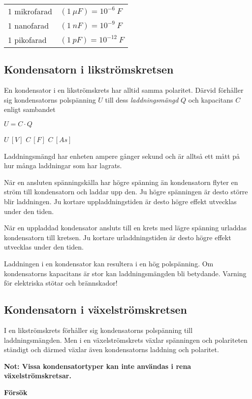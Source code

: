 \begin{tabular}{ll}
1 mikrofarad & \((1\ \mu F) = 10^{-6}\ F\) \\
1 nanofarad & \((1\ nF) = 10^{-9}\ F\) \\
1 pikofarad & \((1\ pF) = 10^{-12}\ F\) \\
\end{tabular}

\subsection{Kondensatorn i likströmskretsen}

En kondensator i en likströmskrets har alltid samma polaritet.
Därvid förhåller sig kondensatorns polspänning \(U\) till dess
\emph{laddningsmängd} \(Q\) och kapacitans \(C\) enligt sambandet

\(U = C \cdot Q\)

\(U\ [V]\) \(C\ [F]\) \(C\ [As]\)

Laddningsmängd har enheten ampere gånger sekund och är alltså ett mått på hur
många laddningar som har lagrats.

När en ansluten spänningskälla har högre spänning än kondensatorn flyter en 
ström till kondensatorn och laddar upp den. Ju högre spänningen är desto större 
blir laddningen. Ju kortare uppladdningstiden är desto högre effekt
utvecklas under den tiden.

När en uppladdad kondensator ansluts till en krets med lägre spänning urladdas 
kondensatorn till kretsen. Ju kortare urladdningstiden är desto högre
effekt utvecklas under den tiden.

Laddningen i en kondensator kan resultera i en hög polspänning. Om kondensatorns
kapacitans är stor kan laddningsmängden bli betydande. Varning för elektriska
stötar och brännskador!

\subsection{Kondensatorn i växelströmskretsen}

I en likströmskrets förhåller sig kondensatorns polspänning till
laddningsmängden. Men i en växelströmskrets växlar spänningen och polariteten 
ständigt och därmed växlar även kondensatorns laddning och polaritet.

\textbf{Not: Vissa kondensatortyper kan inte användas i rena
  växelströmskretsar.}

\textbf{Försök}

